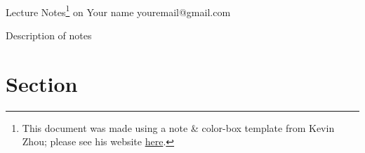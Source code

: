 \documentclass[11pt]{article}
\begin{document}
\thispagestyle{empty}
\bigskip \
\vspace{0.1cm}

\begin{center}
{\fontsize{22}{22} \selectfont Lecture Notes\footnote{This document was made using a note \& color-box template from Kevin Zhou;
please see his website \href{https://knzhou.github.io}{here}.} on}
\vskip 16pt
{\fontsize{36}{36} \selectfont \bf \sffamily [subject]}
\vskip 24pt
{\fontsize{18}{18} \selectfont \rmfamily Your name} 
\vskip 6pt
{\fontsize{14}{14} \selectfont \ttfamily youremail@gmail.com} 
\vskip 24pt
\end{center}

{\parindent0pt \baselineskip=15.5pt}
\noin
Description of notes

\newpage
\microtoc
\newpage

\section{Section}
\end{document}
